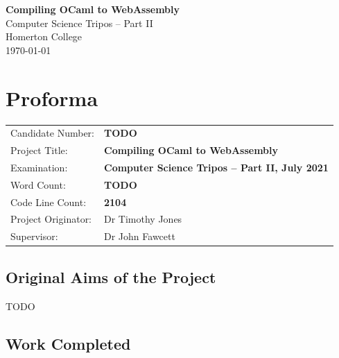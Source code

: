 \documentclass[12pt,a4paper,twoside,openright]{report}
\begin{document}





\pagestyle{empty}


\vspace*{60mm}
\begin{center}
\Huge
\textbf{Compiling OCaml to WebAssembly} \\[5mm]
Computer Science Tripos -- Part II \\[5mm]
Homerton College \\[5mm]
\today  %
\end{center}


\pagestyle{plain}

\chapter*{Proforma}

{\large
\begin{tabular}{ll}
Candidate Number:   & \bf TODO                       \\
Project Title:      & \bf Compiling OCaml to WebAssembly         \\
Examination:        & \bf Computer Science Tripos -- Part II, July 2021  \\
Word Count:         & \bf TODO \\
Code Line Count:    & \bf 2104 \\
Project Originator: & Dr Timothy Jones                    \\
Supervisor:         & Dr John Fawcett                    \\
\end{tabular}
}

\section*{Original Aims of the Project}

TODO

\section*{Work Completed}
\end{document}
